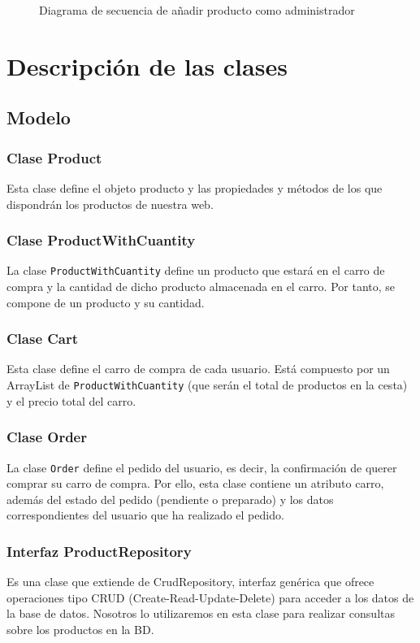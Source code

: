 \documentclass[12pt,a4paper,svgnames]{article}
\begin{document}
\begin{figure}[htbp]
	\centering
	\anadirproductoadministrador
	\caption{Diagrama de secuencia de añadir producto como administrador}
	\label{fig:actividad2}
\end{figure}

\clearpage

\section{Descripción de las clases}\label{sec:descripcion}
\subsection{Modelo}
\subsubsection{Clase Product}
Esta clase define el objeto producto y las propiedades y métodos de los que dispondrán los productos de nuestra web.\\
\subsubsection{Clase ProductWithCuantity}
La clase \texttt{ProductWithCuantity} define un producto que estará en el carro de compra y la cantidad de dicho producto almacenada en el carro. Por tanto, se compone de un producto y su cantidad.\\
\subsubsection{Clase Cart}
Esta clase define el carro de compra de cada usuario. Está compuesto por un ArrayList de \texttt{ProductWithCuantity} (que serán el total de productos en la cesta) y el precio total del carro.\\
\subsubsection{Clase Order}
La clase \texttt{Order} define el pedido del usuario, es decir, la confirmación de querer comprar su carro de compra. Por ello, esta clase contiene un atributo carro, además del estado del pedido (pendiente o preparado) y los datos correspondientes del usuario que ha realizado el pedido.\\
\subsubsection{Interfaz ProductRepository}
Es una clase que extiende de CrudRepository, interfaz genérica que ofrece operaciones tipo CRUD (Create-Read-Update-Delete) para acceder a los datos de la base de datos. Nosotros lo utilizaremos en esta clase para realizar consultas sobre los productos en la BD.\\
\end{document}
